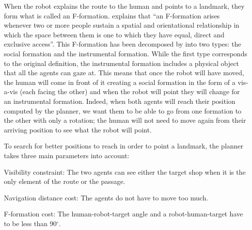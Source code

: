 \documentclass[a4paper,11pt,twoside]{StyleThese}
\begin{document}
When the robot explains the route to the human and points to a landmark, they form what is called an F-formation. \cite{kendon_1990_conducting} explains that ``an F-formation arises whenever two or more people sustain a spatial and orientational relationship in which the space between them is one to which they have equal, direct and exclusive access''.
This F-formation has been decomposed by \cite{mcneill_2005_gesture} into two types: the social formation and the instrumental formation. While the first type corresponds to the original definition, the instrumental formation includes a physical object that all the agents can gaze at. This means that once the robot will have moved, the human will come in front of it creating a social formation in the form of a vis-a-vis (each facing the other) and when the robot will point they will change for an instrumental formation. Indeed, when both agents will reach their position computed by the planner, we want them to be able to go from one formation to the other with only a rotation; the human will not need to move again from their arriving position to see what the robot will point. 

To search for better positions to reach in order to point a landmark, the planner takes three main parameters into account:

\begin{bulletList}
	\item Visibility constraint: The two agents can see either the target shop when it is the only element of the route or the passage.
	\item Navigation distance cost: The agents do not have to move too much.
	\item F-formation cost: The human-robot-target angle and a robot-human-target have to be less than 90${^\circ}$. 
\end{bulletList}
\end{document}
